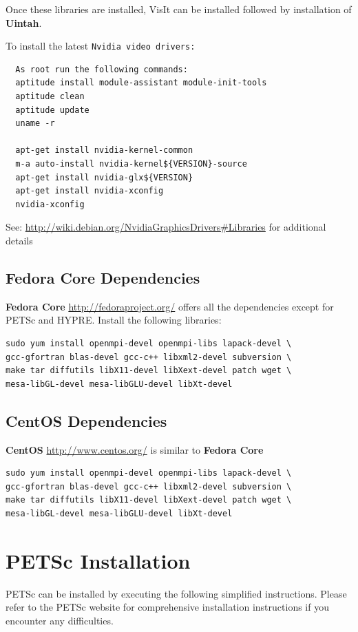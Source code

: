\documentclass[12pt]{article}
\newcommand{\TT}[1]{\tt{#1} \normalfont}
\begin{document}
\noindent Once these libraries are installed, VisIt can be installed
followed by installation of \textbf{Uintah}.

\noindent To install the latest \TT{Nvidia}video drivers:
\begin{verbatim}
  As root run the following commands:
  aptitude install module-assistant module-init-tools
  aptitude clean
  aptitude update
  uname -r
  
  apt-get install nvidia-kernel-common
  m-a auto-install nvidia-kernel${VERSION}-source
  apt-get install nvidia-glx${VERSION}
  apt-get install nvidia-xconfig
  nvidia-xconfig
\end{verbatim}
See: \url{http://wiki.debian.org/NvidiaGraphicsDrivers#Libraries} for additional details

\subsection{Fedora Core  Dependencies}

\textbf{Fedora Core} \url{http://fedoraproject.org/} offers all the
dependencies except for PETSc and HYPRE.  Install the following
libraries:
\begin{verbatim}
sudo yum install openmpi-devel openmpi-libs lapack-devel \
gcc-gfortran blas-devel gcc-c++ libxml2-devel subversion \ 
make tar diffutils libX11-devel libXext-devel patch wget \
mesa-libGL-devel mesa-libGLU-devel libXt-devel 
\end{verbatim} 


\subsection{CentOS  Dependencies}

\textbf{CentOS} \url{http://www.centos.org/} is similar to \textbf{Fedora
Core} 

\begin{verbatim}
sudo yum install openmpi-devel openmpi-libs lapack-devel \
gcc-gfortran blas-devel gcc-c++ libxml2-devel subversion \ 
make tar diffutils libX11-devel libXext-devel patch wget \
mesa-libGL-devel mesa-libGLU-devel libXt-devel 
\end{verbatim} 


\section{PETSc Installation}

PETSc can be installed by executing the following simplified
instructions.  Please refer to the PETSc website for comprehensive
installation instructions if you encounter any difficulties.
\end{document}

